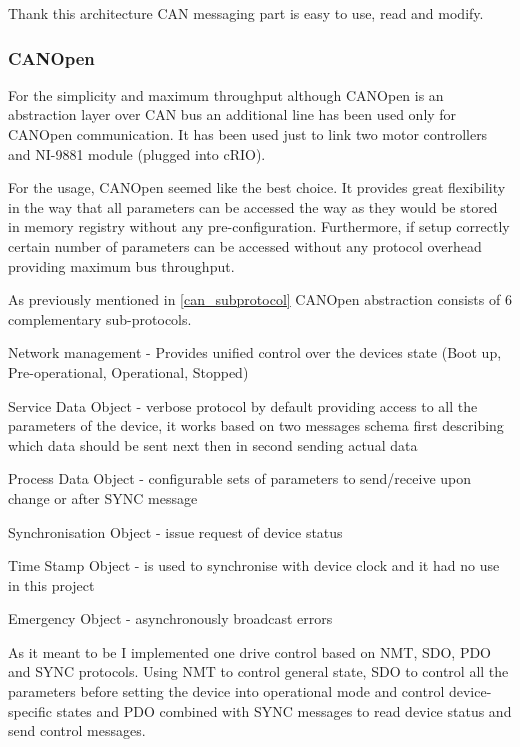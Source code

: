 \vspace{5mm}
\noindent Thank this architecture CAN messaging part is easy to use, read and modify.

\subsubsection{CANOpen}
For the simplicity and maximum throughput although CANOpen is an abstraction layer over CAN bus an additional line has been used only for CANOpen communication. It has been used just to link two motor controllers and NI-9881 module (plugged into cRIO).

For the usage, CANOpen seemed like the best choice. It provides great flexibility in the way that all parameters can be accessed the way as they would be stored in memory registry without any pre-configuration. Furthermore, if setup correctly certain number of parameters can be accessed without any protocol overhead providing maximum bus throughput.

As previously mentioned in \ref{can_subprotocol} CANOpen abstraction consists of 6 complementary sub-protocols.
\begin{description}[labelindent=1cm]
    \item[NMT] Network management - Provides unified control over the devices state (Boot up, Pre-operational, Operational, Stopped)
    \item[SDO] Service Data Object - verbose protocol by default providing access to all the parameters of the device, it works based on two messages schema first describing which data should be sent next then in second sending actual data
    \item[PDO] Process Data Object - configurable sets of parameters to send/receive upon change or after SYNC message
    \item[SYNC]    Synchronisation Object - issue request of device status
    \item[TIME]    Time Stamp Object - is used to synchronise with device clock and it had no use in this project
    \item[EMCY] Emergency Object - asynchronously broadcast errors
\end{description}

As it meant to be I implemented one drive control based on NMT, SDO, PDO and SYNC protocols. Using NMT to control general state, SDO to control all the parameters before setting the device into operational mode and control device-specific states and PDO combined with SYNC messages to read device status and send control messages.

